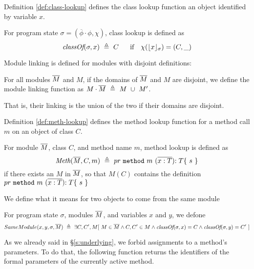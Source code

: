 Definition \ref{def:class-lookup} defines the class lookup function an object 
identified by variable $x$.
\begin{definition}
\label{def:class-lookup}
For program state $\sigma = ({\overline {\phi}}\cdot\phi, \chi)$, class lookup is defined as 
$$\class{\sigma}{x}\ \triangleq\ C \ \ \ \ \ \mbox{if} \ \ \  \chi(\interpret{\sigma}{x})=(C,\_ )$$
\end{definition}

Module linking is defined for modules with disjoint definitions:

\begin{definition}
\label{def:linking}
For all modules $\overline{M}$ and $M$, if the domains of $\overline{M}$ and $M$ are disjoint, 
we define the module linking function as $M\cdot \overline{M}\ \triangleq\ M\ \cup\ M'$.
\end{definition}
That is,  their linking is the union of the two if their domains are disjoint.

Definition \ref{def:meth-lookup} defines the method lookup function for a method
call $m$ on an object of class $C$.
\begin{definition}
\label{def:meth-lookup}
For module $\overline{M}$, class $C$, and method name $m$, method lookup is defined as 
$$\textit{Meth}(\overline{M}, C, m)\ \triangleq\ { pr}\  \mbox{\normalfont{\texttt{method}}}\ m\ (\overline{x : T}) {:T}\{\ s\ \}  $$
if there exists an $M$ in $\overline{M}$, so that $M(C)$ contains the definition ${ pr}\  \prg{method}\ m\ (\overline{x : T}) {:T}\{\ s\ \} $
\end{definition}





We define what it means for two objects to come from the same module
\begin{definition}
\label{def:same:module}
For program state $\sigma$,  modules $\overline{M}$, and variables $x$ and $y$, we defone
$$\Same {x} {y} {\sigma}{\Mtwo}\ \triangleq\ \exists C, C', M[ \ M\in \Mtwo \wedge C, C'\in M \wedge  \class{\sigma}{x}=C \wedge \class{\sigma}{y} =C'\ ]$$
\end{definition}

As we already said in \S \ref{s:underlying}, we forbid assignments to a method's parameters. 
To do that, the following function returns the  identifiers of the formal parameters of the currently active method.




